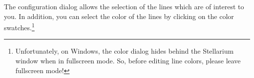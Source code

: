 The configuration dialog allows the selection of the lines which are
of interest to you. 
%
%
In addition, you can select the color of the lines by clicking on the
color swatches.\footnote{Unfortunately, on Windows, the color dialog hides
behind the Stellarium window when in fullscreen mode. So, before
editing line colors, please leave fullscreen mode!}

% 
% 
% 


